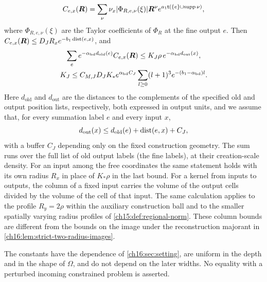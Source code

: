 \begin{theorem}
\begin{enumerate}
\[
 C_{e,x}(\boldsymbol R)=\sum_\nu\nu_x|\Phi_{R,e,\nu}(\xi)|
       \boldsymbol R^\nu
             e^{a_1\mathsf t(\{e\}\cup\operatorname{supp}\nu)},
\]
where $\Phi_{R,e,\nu}(\xi)$ are the Taylor coefficients of $\Phi_R$ at the fine output $e$. Then $C_{e,x}(\boldsymbol R)\le D_JR_xe^{-b_1\operatorname{dist}(e,x)}$, and
\[
 \begin{gathered}
 \sum_e e^{-\alpha_{\mathrm{bd}} d_{\mathrm{old}}(e)}C_{e,x}(\boldsymbol R)
       \le K_J\rho\,e^{-\alpha_{\mathrm{bd}} d_{\mathrm{out}}(x)},\\
 K_J\le C_{M,J}D_JK_*e^{\alpha_{\mathrm{bd}} C_J}
         \sum_{l\ge0}(l+1)^3e^{-(b_1-\alpha_{\mathrm{bd}})l}.
 \end{gathered}
\]
Here $d_{\mathrm{old}}$ and $d_{\mathrm{out}}$ are the distances to the complements of the specified old and output position lists, respectively, both expressed in output units, and we assume that, for every summation label $e$ and every input $x$,
\[
 d_{\mathrm{out}}(x)\le d_{\mathrm{old}}(e)+\operatorname{dist}(e,x)+C_J,
\]
with a buffer $C_J$ depending only on the fixed construction geometry. The sum runs over the full list of old output labels (the fine labels), at their creation-scale density. For an input among the free coordinates the same statement holds with its own radius $R_x$ in place of $K_*\rho$ in the last bound. For a kernel from inputs to outputs, the column of a fixed input carries the volume of the output cells divided by the volume of the cell of that input. The same calculation applies to the profile $R_y=2\rho$ within the auxiliary construction ball and to the smaller spatially varying radius profiles of \cref{ch15:def:regional-norm}. These column bounds are different from the bounds on the image under the reconstruction majorant in \cref{ch16:lem:strict-two-radius-images}.
\end{enumerate}
The constants have the dependence of \cref{ch16:sec:setting}, are uniform in the depth and in the shape of $\Omega$, and do not depend on the later widths. No equality with a perturbed incoming constrained problem is asserted.
\end{theorem}


